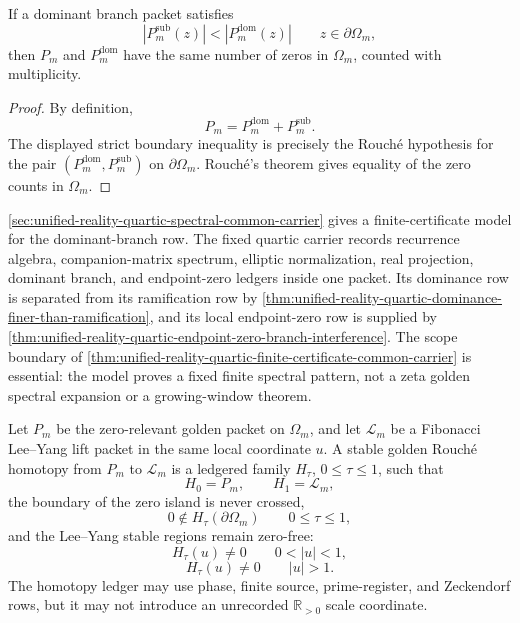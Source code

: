 \begin{theorem}
\label{thm:rh-dominant-gap-gives-rouche-control}
If a dominant branch packet satisfies
$$
|P_m^{\mathrm{sub}}(z)|<|P_m^{\mathrm{dom}}(z)|
\qquad
z\in\partial\Omega_m,
$$
then $P_m$ and $P_m^{\mathrm{dom}}$ have the same number of zeros in
$\Omega_m$, counted with multiplicity.
\end{theorem}

\begin{proof}
By definition,
$$
P_m=P_m^{\mathrm{dom}}+P_m^{\mathrm{sub}}.
$$
The displayed strict boundary inequality is precisely the Rouch\'e
hypothesis for the pair $(P_m^{\mathrm{dom}},P_m^{\mathrm{sub}})$ on
$\partial\Omega_m$.  Rouch\'e's theorem gives equality of the zero
counts in $\Omega_m$.
\end{proof}

\begin{principle}
\label{prin:rh-quartic-endpoint-finite-model}
\autoref{sec:unified-reality-quartic-spectral-common-carrier} gives a
finite-certificate model for the dominant-branch row.  The fixed quartic
carrier records recurrence algebra, companion-matrix spectrum, elliptic
normalization, real projection, dominant branch, and endpoint-zero
ledgers inside one packet.  Its dominance row is separated from its
ramification row by
\autoref{thm:unified-reality-quartic-dominance-finer-than-ramification},
and its local endpoint-zero row is supplied by
\autoref{thm:unified-reality-quartic-endpoint-zero-branch-interference}.
The scope boundary of
\autoref{thm:unified-reality-quartic-finite-certificate-common-carrier}
is essential: the model proves a fixed finite spectral pattern, not a
zeta golden spectral expansion or a growing-window theorem.
\end{principle}

\begin{definition}
\label{def:rh-golden-stable-rouche-homotopy}
Let $P_m$ be the zero-relevant golden packet on $\Omega_m$, and let
$\mathcal L_m$ be a Fibonacci Lee--Yang lift packet in the same local
coordinate $u$.  A stable golden Rouch\'e homotopy from $P_m$ to
$\mathcal L_m$ is a ledgered family $H_{\tau}$, $0\le\tau\le1$, such
that
$$
H_0=P_m,
\qquad
H_1=\mathcal L_m,
$$
the boundary of the zero island is never crossed,
$$
0\notin H_{\tau}(\partial\Omega_m)
\qquad
0\le\tau\le1,
$$
and the Lee--Yang stable regions remain zero-free:
$$
H_{\tau}(u)\neq0
\qquad
0<|u|<1,
$$
$$
H_{\tau}(u)\neq0
\qquad
|u|>1.
$$
The homotopy ledger may use phase, finite source, prime-register, and
Zeckendorf rows, but it may not introduce an unrecorded
$\mathbb R_{>0}$ scale coordinate.
\end{definition}

